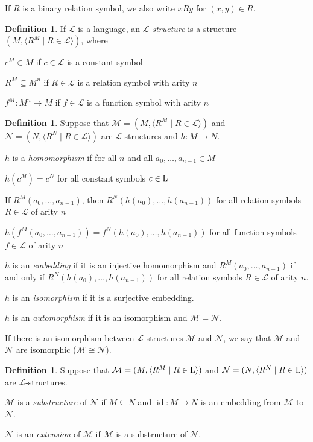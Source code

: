 \documentclass[10pt]{amsart}
\renewcommand{\L}{\mathcal{L}}
\newcommand{\id}{\operatorname{id}}
\newcommand{\LL}{{\rm{L}}}
\newcommand{\MM}{\mathcal{M}}
\newcommand{\NN}{\mathcal{N}}
\theoremstyle{definition}
\newtheorem{definition}[theorem]{Definition}
\theoremstyle{remark}
\newenvironment{enumerate-(a)}{\begin{enumerate}[label={\upshape (\alph*)}, leftmargin=2pc]}{\end{enumerate}}
\newenvironment{enumerate-(i)}{\begin{enumerate}[label={\upshape (\roman*)}, leftmargin=2pc]}{\end{enumerate}}
\begin{document}
If $R$ is a binary relation symbol, we also write $xRy$ for $(x,y)\in R$. 

\begin{definition} 
If $\L$ is a language, an \emph{$\L$-structure} is a structure $(M,\langle R^M\mid R\in \L \rangle)$, where 
\begin{enumerate-(a)} 
\item 
$c^M\in M$ if $c\in\L$ is a constant symbol 
\item 
$R^M\subseteq M^n$ if $R\in\L$ is a relation symbol with arity $n$ 
\item 
$f^M\colon M^n\rightarrow M$ if $f\in\L$ is a function symbol with arity $n$ 
\end{enumerate-(a)} 
\end{definition} 

\begin{definition} 
Suppose that $\MM=(M,\langle R^M\mid R\in\L\rangle)$ and $\NN=(N,\langle R^N\mid R\in\L\rangle)$ are $\L$-structures and $h\colon M\rightarrow N$. 
\begin{enumerate-(a)} 
\item 
$h$ is a \emph{homomorphism} if for all $n$ and all $a_0,\dots,a_{n-1}\in M$ 
\begin{enumerate-(i)} 
\item 
$h(c^M)=c^N$ for all constant symbols $c\in\LL$ 
\item 
If $R^M(a_0,\dots,a_{n-1})$, then $R^N(h(a_0),\dots,h(a_{n-1}))$ for all relation symbols $R\in\L$ of arity $n$ 
\item 
$h(f^M(a_0,\dots,a_{n-1}))=f^N(h(a_0),\dots,h(a_{n-1}))$ for all function symbols $f\in\L$ of arity $n$ 
\end{enumerate-(i)} 
\item 
$h$ is an \emph{embedding} if it is an injective homomorphism and $R^M(a_0,\dots,a_{n-1})$ if and only if $R^N(h(a_0),\dots,h(a_{n-1}))$ for all relation symbols $R\in\L$ of arity $n$. 
\item 
$h$ is an \emph{isomorphism} if it is a surjective embedding. 
\item 
$h$ is an \emph{automorphism} if it is an isomorphism and $\MM=\NN$. 
\end{enumerate-(a)} 
\end{definition} 

If there is an isomorphism between $\L$-structures $\MM$ and $\NN$, we say that $\MM$ and $\NN$ are isomorphic ($\MM\cong\NN$). 

\begin{definition} 
Suppose that $\MM=(M, \langle R^M\mid R\in\LL\rangle)$ and $\NN=(N, \langle R^N\mid R\in\LL\rangle)$ are $\L$-structures. 
\begin{enumerate-(a)} 
\item 
$\MM$ is a \emph{substructure} of $\NN$ if $M\subseteq N$ and $\id\colon M\rightarrow N$ is an embedding from $\MM$ to $\NN$. 
\item 
$\NN$ is an \emph{extension} of $\MM$ if $\MM$ is a substructure of $\NN$. 
\end{enumerate-(a)} 
\end{definition} 
\end{document}
